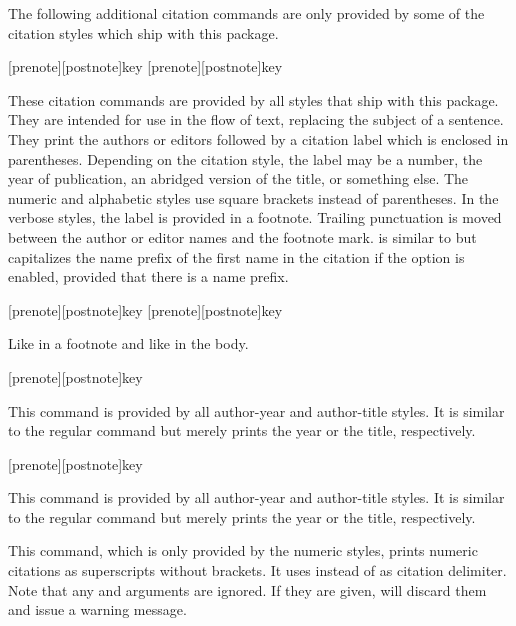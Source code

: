 The following additional citation commands are only provided by some of the citation styles which ship with this package.

\begin{ltxsyntax}

[prenote][postnote]{key}
[prenote][postnote]{key}

These citation commands are provided by all styles that ship with this package. They are intended for use in the flow of text, replacing the subject of a sentence. They print the authors or editors followed by a citation label which is enclosed in parentheses. Depending on the citation style, the label may be a number, the year of publication, an abridged version of the title, or something else. The numeric and alphabetic styles use square brackets instead of parentheses. In the verbose styles, the label is provided in a footnote. Trailing punctuation is moved between the author or editor names and the footnote mark.  is similar to  but capitalizes the name prefix of the first name in the citation if the  option is enabled, provided that there is a name prefix.

[prenote][postnote]{key}
[prenote][postnote]{key}

Like  in a footnote and like  in the body.

[prenote][postnote]{key}

This command is provided by all author-year and author-title styles. It is similar to the regular  command but merely prints the year or the title, respectively.

[prenote][postnote]{key}

This command is provided by all author-year and author-title styles. It is similar to the regular  command but merely prints the year or the title, respectively.


This command, which is only provided by the numeric styles, prints numeric citations as superscripts without brackets. It uses  instead of  as citation delimiter. Note that any  and  arguments are ignored. If they are given,  will discard them and issue a warning message.

\end{ltxsyntax}

